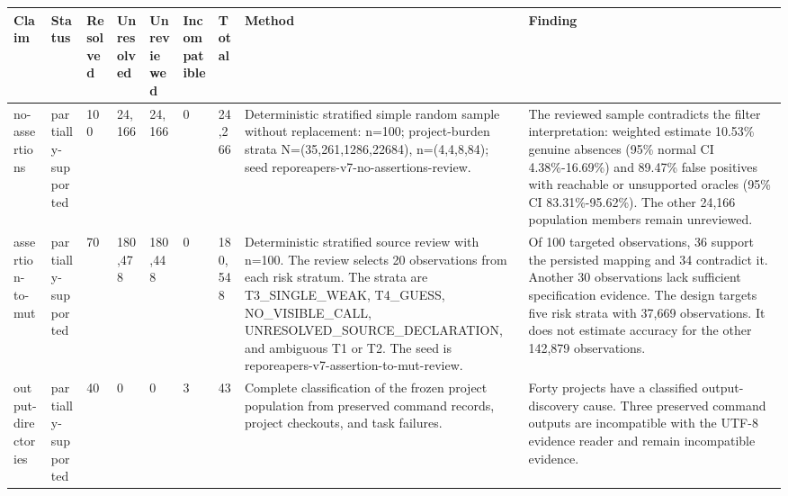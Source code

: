   \renewcommand{\theHreporttablerow}{rq6_reconstruction_summary.\arabic{reporttablerow}}
  \setcounter{reporttablerow}{0}
  \begin{tabular}{lllllllll}
  \toprule
  Claim & Status & Resolved & Unresolved & Unreviewed & Incompatible & Total & Method & Finding \\
  \midrule
  {reporttablerow}\label{tabrow:rq6_reconstruction_summary:no-assertions}no-assertions & partially-supported & 100 & 24,166 & 24,166 & 0 & 24,266 & Deterministic stratified simple random sample without replacement: n=100; project-burden strata N=(35,261,1286,22684), n=(4,4,8,84); seed reporeapers-v7-no-assertions-review. & The reviewed sample contradicts the filter interpretation: weighted estimate 10.53\% genuine absences (95\% normal CI 4.38\%-16.69\%) and 89.47\% false positives with reachable or unsupported oracles (95\% CI 83.31\%-95.62\%). The other 24,166 population members remain unreviewed. \\
  {reporttablerow}\label{tabrow:rq6_reconstruction_summary:assertion-to-mut}assertion-to-mut & partially-supported & 70 & 180,478 & 180,448 & 0 & 180,548 & Deterministic stratified source review with n=100. The review selects 20 observations from each risk stratum. The strata are T3\_SINGLE\_WEAK, T4\_GUESS, NO\_VISIBLE\_CALL, UNRESOLVED\_SOURCE\_DECLARATION, and ambiguous T1 or T2. The seed is reporeapers-v7-assertion-to-mut-review. & Of 100 targeted observations, 36 support the persisted mapping and 34 contradict it. Another 30 observations lack sufficient specification evidence. The design targets five risk strata with 37,669 observations. It does not estimate accuracy for the other 142,879 observations. \\
  {reporttablerow}\label{tabrow:rq6_reconstruction_summary:output-directories}output-directories & partially-supported & 40 & 0 & 0 & 3 & 43 & Complete classification of the frozen project population from preserved command records, project checkouts, and task failures. & Forty projects have a classified output-discovery cause. Three preserved command outputs are incompatible with the UTF-8 evidence reader and remain incompatible evidence. \\
  \bottomrule
  \end{tabular}
